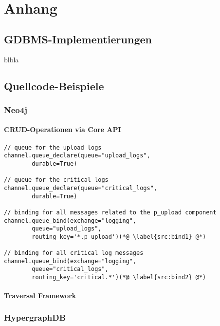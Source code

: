 \chapter{Anhang }
\label{cha:Anhang}

\section{GDBMS-Implementierungen}
\label{anh:vendor_list}

blbla

\section{Quellcode-Beispiele}

\subsection{Neo4j}

\subsubsection{CRUD-Operationen via Core API}
\label{anh:neo4j_native_api}

\begin{lstlisting}
// queue for the upload logs
channel.queue_declare(queue="upload_logs",
        durable=True)

// queue for the critical logs
channel.queue_declare(queue="critical_logs",
        durable=True)
 
// binding for all messages related to the p_upload component
channel.queue_bind(exchange="logging",
        queue="upload_logs",
        routing_key='*.p_upload')(*@ \label{src:bind1} @*)

// binding for all critical log messages
channel.queue_bind(exchange="logging",
        queue="critical_logs",
        routing_key='critical.*')(*@ \label{src:bind2} @*)
\end{lstlisting}

\subsubsection{Traversal Framework}
\label{anh:neo4j_traversal_framework}

\subsection{HypergraphDB}

